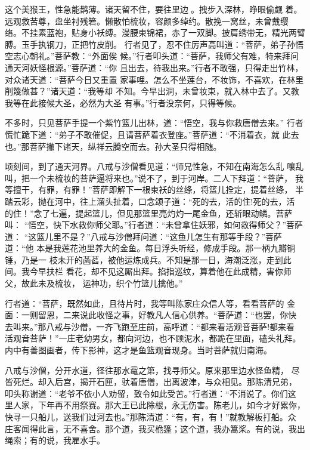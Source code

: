 这个美猴王，性急能鹊薄。诸天留不住，要往里边。拽步入深林，睁眼偷觑
着。远观救苦尊，盘坐衬残箬。懒散怕梳妆，容颜多绰约。散挽一窝丝，未曾戴缨
络。不挂素蓝袍，贴身小袄缚。漫腰束锦裙，赤了一双脚。披肩绣带无，精光两臂
膊。玉手执钢刀，正把竹皮削。
行者见了，忍不住厉声高叫道：“菩萨，弟子孙悟空志心朝礼。”菩萨教：“外面俟
候。”行者叩头道：“菩萨，我师父有难，特来拜问通天河妖怪根源。”菩萨道：“你
且出去，待我出来。”行者不敢强，只得走出竹林，对众诸天道：“菩萨今日又重置
家事哩。怎么不坐莲台，不妆饰，不喜欢，在林里削篾做甚？”诸天道：“我等却
不知。今早出洞，未曾妆束，就入林中去了。又教我等在此接候大圣，必然为大圣
有事。”行者没奈何，只得等候。

不多时，只见菩萨手提一个紫竹篮儿出林，道：“悟空，我与你救唐僧去来。”
行者慌忙跪下道：“弟子不敢催促，且请菩萨着衣登座。”菩萨道：“不消着衣，就
此去也。”那菩萨撇下诸天，纵祥云腾空而去。孙大圣只得相随。

顷刻间，到了通天河界。八戒与沙僧看见道：“师兄性急，不知在南海怎么乱
嚷乱叫，把一个未梳妆的菩萨逼将来也。”说不了，到于河岸。二人下拜道：“菩萨，
我等擅干，有罪，有罪！”菩萨即解下一根束袄的丝绦，将篮儿拴定，提着丝绦，
半踏云彩，抛在河中，往上溜头扯着，口念颂子道：“死的去，活的住!死的去，活
的住！”念了七遍，提起篮儿，但见那篮里亮灼灼一尾金鱼，还斩眼动鳞。菩萨叫：
“悟空，快下水救你师父耶。”行者道：“未曾拿住妖邪，如何救得师父？”菩萨道：
“这篮儿里不是？”八戒与沙僧拜问道：“这鱼儿怎生有那等手段？”菩萨道：“他
本是我莲花池里养大的金鱼。每日浮头听经，修成手段。那一柄九瓣铜锤，乃是一
枝未开的菡萏，被他运炼成兵。不知是那一日，海潮泛涨，走到此间。我今早扶栏
看花，却不见这厮出拜。掐指巡纹，算着他在此成精，害你师父，故此未及梳妆，
运神功，织个竹篮儿擒他。”

行者道：“菩萨，既然如此，且待片时，我等叫陈家庄众信人等，看看菩萨的
金面：一则留恩，二来说此收怪之事，好教凡人信心供养。“菩萨道：“也罢，你快
去叫来。”那八戒与沙僧，一齐飞跑至庄前，高呼道：“都来看活观音菩萨!都来看
活观音菩萨！”一庄老幼男女，都向河边，也不顾泥水，都跪在里面，磕头礼拜。
内中有善图画者，传下影神，这才是鱼篮观音现身。当时菩萨就归南海。

八戒与沙僧，分开水道，径往那水鼋之第，找寻师父。原来那里边水怪鱼精，
尽皆死烂。却入后宫，揭开石匣，驮着唐僧，出离波津，与众相见。那陈清兄弟，
叩头称谢道：“老爷不依小人劝留，致令如此受苦。”行者道：“不消说了。你们这
里人家，下年再不用祭赛。那大王已此除根，永无伤害。陈老儿，如今才好累你，
快寻一只船儿，送我们过河去也。”那陈清道：“有，有，有！”就教解板打船。众
庄客闻得此言，无不喜舍。那个道，我买桅篷；这个道，我办篙桨。有的说，我出
绳索；有的说，我雇水手。

